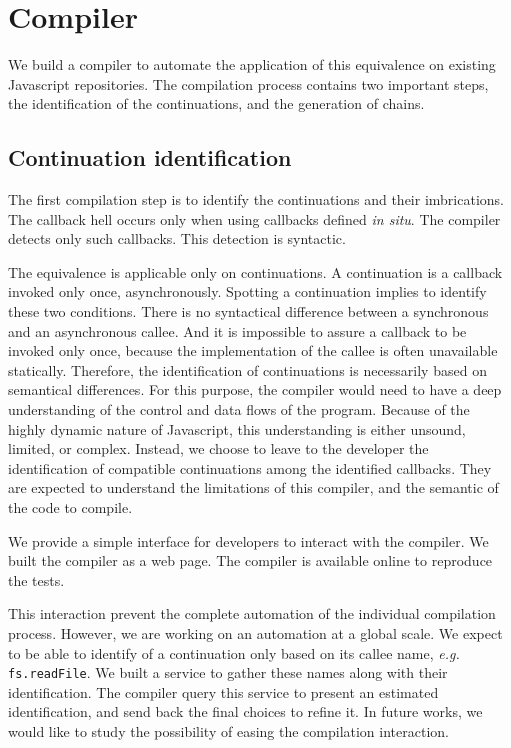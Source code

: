 \section{Compiler} \label{section:compiler}

We build a compiler to automate the application of this equivalence on existing Javascript repositories.
The compilation process contains two important steps, the identification of the continuations, and the generation of chains.

\subsection{Continuation identification}

The first compilation step is to identify the continuations and their imbrications.
The callback hell occurs only when using callbacks defined \textit{in situ}.
The compiler detects only such callbacks.
This detection is syntactic.

The equivalence is applicable only on continuations.
A continuation is a callback invoked only once, asynchronously.
Spotting a continuation implies to identify these two conditions.
There is no syntactical difference between a synchronous and an asynchronous callee.
And it is impossible to assure a callback to be invoked only once, because the implementation of the callee is often unavailable statically.
Therefore, the identification of continuations is necessarily based on semantical differences.
For this purpose, the compiler would need to have a deep understanding of the control and data flows of the program.
Because of the highly dynamic nature of Javascript, this understanding is either unsound, limited, or complex.
Instead, we choose to leave to the developer the identification of compatible continuations among the identified callbacks.
They are expected to understand the limitations of this compiler, and the semantic of the code to compile.

We provide a simple interface for developers to interact with the compiler.
We built the compiler as a web page.
The compiler is available online to reproduce the tests.

This interaction prevent the complete automation of the individual compilation process.
However, we are working on an automation at a global scale.
We expect to be able to identify of a continuation only based on its callee name, \textit{e.g.} \texttt{fs.readFile}.
We built a service to gather these names along with their identification.
The compiler query this service to present an estimated identification, and send back the final choices to refine it.
In future works, we would like to study the possibility of easing the compilation interaction.

